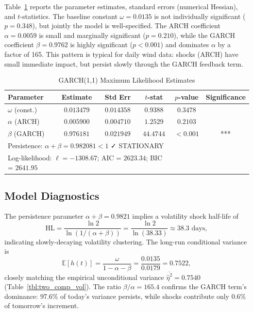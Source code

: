 \documentclass[11pt, a4paper, twoside]{article}
\begin{document}
Table~\ref{tbl:garch_mle} reports the parameter estimates, standard errors (numerical Hessian), and $t$-statistics. The baseline constant $\omega = 0.0135$ is not individually significant ($p = 0.348$), but jointly the model is well-specified. The ARCH coefficient $\alpha = 0.0059$ is small and marginally significant ($p = 0.210$), while the GARCH coefficient $\beta = 0.9762$ is highly significant ($p < 0.001$) and dominates $\alpha$ by a factor of 165. This pattern is typical for daily wind data: shocks (ARCH) have small immediate impact, but persist slowly through the GARCH feedback term.

\begin{table}[ht]
\centering
\caption{GARCH(1,1) Maximum Likelihood Estimates}
\label{tbl:garch_mle}
\small
\begin{tabularx}{\textwidth}{l|cccc|c}
\toprule
\textbf{Parameter} & \textbf{Estimate} & \textbf{Std Err} & \textbf{$t$-stat} & \textbf{$p$-value} & \textbf{Significance} \\
\midrule
$\omega$ (const.) & $0.013479$ & $0.014358$ & $0.9388$ & $0.3478$ & \\
$\alpha$ (ARCH) & $0.005900$ & $0.004710$ & $1.2529$ & $0.2103$ & \\
$\beta$ (GARCH) & $0.976181$ & $0.021949$ & $44.4744$ & $< 0.001$ & *** \\
\midrule
\multicolumn{4}{l}{Persistence: $\alpha + \beta = 0.982081 < 1$ \quad ✓ STATIONARY} \\
\multicolumn{4}{l}{Log-likelihood: $\ell = -1308.67$; AIC = $2623.34$; BIC = $2641.95$} \\
\bottomrule
\end{tabularx}
\end{table}

\subsection{Model Diagnostics}

The persistence parameter $\alpha + \beta = 0.9821$ implies a volatility shock half-life of
\begin{equation}
\text{HL} = \frac{\ln 2}{\ln(1/(\alpha+\beta))} = \frac{\ln 2}{\ln(38.33)} \approx 38.3 \text{ days},
\end{equation}
indicating slowly-decaying volatility clustering. The long-run conditional variance is
\begin{equation}
\mathbb{E}[h(t)] = \frac{\omega}{1 - \alpha - \beta} = \frac{0.0135}{0.0179} = 0.7522,
\end{equation}
closely matching the empirical unconditional variance $\overline{\hat{\eta}^2} = 0.7540$ (Table~\ref{tbl:two_comp_vol}). The ratio $\beta/\alpha = 165.4$ confirms the GARCH term's dominance: 97.6\% of today's variance persists, while shocks contribute only 0.6\% of tomorrow's increment.
\end{document}
